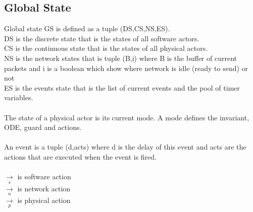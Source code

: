 \documentclass[]{article}
\begin{document}
\subsection{Global State}
Global state GS is defined as a tuple (DS,CS,NS,ES). \\
DS is the discrete state that is the states of all software actors. \\
CS is the continuous state that is the states of all physical actors.  \\
NS is the network states that is tuple (B,i) where B is the buffer of current packets and i is a boolean which show where network is idle (ready to send) or not \\
ES is the events state that is the list of current events and the pool of timer variables. \\
\\
The state of a physical actor is its current mode. A mode defines the invariant, ODE, guard and actions. \\
\\
An event is a tuple (d,acts) where d is the delay of this event and acts are the actions that are executed when the event is fired. \\
\\
$\xrightarrow[s]{}$ is software action \\
$\xrightarrow[n]{}$ is network action \\
$\xrightarrow[p]{}$ is physical action \\
\\
\end{document}
